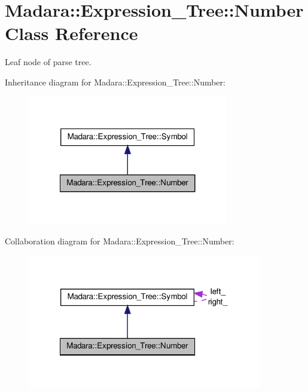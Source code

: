 \hypertarget{classMadara_1_1Expression__Tree_1_1Number}{
\section{Madara::Expression\_\-Tree::Number Class Reference}
\label{d9/da9/classMadara_1_1Expression__Tree_1_1Number}
}


Leaf node of parse tree.  




Inheritance diagram for Madara::Expression\_\-Tree::Number:
\nopagebreak
\begin{figure}[H]
\begin{center}
\leavevmode
\includegraphics[width=248pt]{d9/dc4/classMadara_1_1Expression__Tree_1_1Number__inherit__graph}
\end{center}
\end{figure}


Collaboration diagram for Madara::Expression\_\-Tree::Number:
\nopagebreak
\begin{figure}[H]
\begin{center}
\leavevmode
\includegraphics[width=290pt]{d8/d3f/classMadara_1_1Expression__Tree_1_1Number__coll__graph}
\end{center}
\end{figure}
